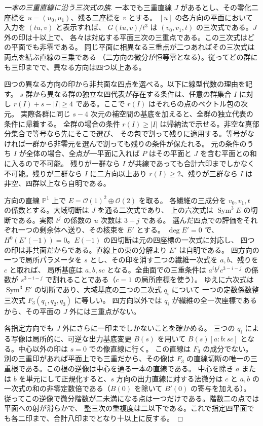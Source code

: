 \begin{proof}[一本の三重直線に沿う三次式の族]
一本でも三重直線 $J$ があるとし、その零化二座標を $u=(u_0,u_1)$、残る二座標を $v$ とする。
$[u]$ の各方向の平面において入力を $(t u,v)$ と表示すれば、
$G(tu,v)/t^3$ は $(v_0,v_1,t)$ の三次式である。$J$ 外の印は十以上で、
各々は対応する平面三次の三重点である。この三次式はどの平面でも非零である。
同じ平面に相異なる三重点が二つあればその三次式は両点を結ぶ直線の三乗である
（二方向の微分が恒等零となる）。従ってどの群にも三印までで、異なる方向は四つ以上ある。

四つの異なる方向の印から非共面な四点を選べる。以下に線型代数の理由を記す。
$s$ 群から異なる群の独立な四代表が存在する条件は、任意の群集合 $I$ に対し
$r(I)+s-|I|\ge4$ である。ここで $r(I)$ はそれらの点のベクトル包の次元。
実際各群に同じ $s-4$ 次元の補空間の基底を加えると、全群の独立代表の条件に帰着する。
全群の場合の条件 $r(I)\ge |I|$ は帰納法で示せる。非空な真部分集合で等号なら先にそこで選び、
その包で割って残りに適用する。等号がなければ一群から非零元を選んで割っても残りの条件が保たれる。
元の条件のうち $I$ が全体の場合、全点が一平面に入れば $P$ はその平面と $J$ を含む平面との和に入るので不可能。
残りが一群なら $I$ が共線であっても合計六印までしかなく不可能。残りが二群なら $I$ に二方向以上あり
$r(I)\ge2$、残りが三群なら $I$ は非空、四群以上なら自明である。

方向の直線 $\mathbb P^1$ 上で $E=\mathcal O(1)^2\oplus\mathcal O(2)$ を取る。
各繊維の三成分を $v_0,v_1,t$ の係数とする。大域切断は $J$ を通る二次式であり、
上の六次式は $\operatorname{Sym}^3 E$ の切断である。実際 $t^j$ の係数の $u$ 次数は $3+j$ である。
選んだ四点での評価をそれぞれ一つの剰余体へ送り、その核束を $E'$ とする。
$\deg E'=0$ で、$H^0(E'(-1))=0$。$E(-1)$ の四切断は元の四座標の一次式に対応し、
四つの印は非共面だからである。直線上の束の分解より $E'$ は自明である。
四方向の一つで局所パラメータを $s$ とし、その印を消す二つの繊維一次式を $a,b$、残りを $c$ と取れば、
局所基底は $a,b,sc$ となる。全曲面での三重条件は $a^i b^j c^{3-i-j}$ の係数が
$s^{3-i-j}$ で割れることである（$c=1$ の局所座標を使う）。
ゆえに六次式は $\operatorname{Sym}^3 E'$ の切断であり、大域基底の三つの二次式 $q_i$ について
一つの定数係数整三次式 $F_3(q_1,q_2,q_3)$ に等しい。
四方向以外では $q_i$ が繊維の全一次座標であるから、その平面の $J$ 外には三重点がない。

各指定方向でも $J$ 外にさらに一印までしかないことを確かめる。
三つの $q_i$ による写像は局所的に、可逆な出力基底変更 $B(s)$ を用いて
$B(s)[a:b:sc]$ となる。中心以外の印は $s=0$ での像直線に行く。
この直線は $F_3$ の成分でない。別の三重印があれば平面上でも三重だから、その像は
$F_3$ の直線切断の唯一の三重根である。この根の逆像は中心を通る一本の直線である。
中心を除き $a$ または $b$ を単元にして正規化すると、$s$ 方向の出力直線に対する法微分は
$c$ と $a,b$ の一次式の和の非零定数倍である（$B(0)$ を除いて $B'(0)$ の寄与を加える）。
従ってこの逆像で微分階数が二未満になる点は一つだけである。階数二の点では平面への射が滑らかで、
整三次の重複度は二以下である。これで指定四平面でも各二印まで、合計八印までとなり十以上に反する。
\end{proof}
